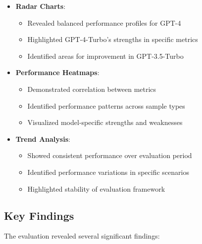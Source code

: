\begin{itemize}
    \item \textbf{Radar Charts}:
    \begin{itemize}
        \item Revealed balanced performance profiles for GPT-4
        \item Highlighted GPT-4-Turbo's strengths in specific metrics
        \item Identified areas for improvement in GPT-3.5-Turbo
    \end{itemize}

    \item \textbf{Performance Heatmaps}:
    \begin{itemize}
        \item Demonstrated correlation between metrics
        \item Identified performance patterns across sample types
        \item Visualized model-specific strengths and weaknesses
    \end{itemize}

    \item \textbf{Trend Analysis}:
    \begin{itemize}
        \item Showed consistent performance over evaluation period
        \item Identified performance variations in specific scenarios
        \item Highlighted stability of evaluation framework
    \end{itemize}
\end{itemize}

\subsection{Key Findings}
The evaluation revealed several significant findings:

